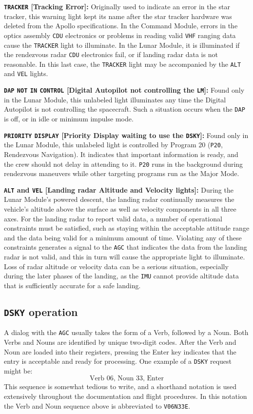 \documentclass[refcap, oxford]{ahsan}
\begin{document}
\textbf{\texttt{TRACKER} [Tracking Error]:} Originally used to indicate an error in the star tracker, this warning light kept its name after the star tracker hardware was deleted from the Apollo specifications. In the Command Module, errors in the optics assembly \texttt{CDU} electronics or problems in reading valid \texttt{VHF} ranging data cause the \texttt{TRACKER} light to illuminate. In the Lunar Module, it is illuminated if the rendezvous radar \texttt{CDU} electronics fail, or if landing radar data is not reasonable. In this last case, the \texttt{TRACKER} light may be accompanied by the \texttt{ALT} and \texttt{VEL} lights.

\textbf{\texttt{DAP} \texttt{NOT} \texttt{IN} \texttt{CONTROL} [Digital Autopilot not controlling the \texttt{LM}]:} Found only in the Lunar Module, this unlabeled light illuminates any time the Digital Autopilot is not controlling the spacecraft. Such a situation occurs when the \texttt{DAP} is off, or in idle or minimum impulse mode.

\textbf{\texttt{PRIORITY} \texttt{DISPLAY} [Priority Display waiting to use the \texttt{DSKY}]:} Found only in the Lunar Module, this unlabeled light is controlled by Program 20 (\texttt{P20}, Rendezvous Navigation). It indicates that important information is ready, and the crew should not delay in attending to it. \texttt{P20} runs in the background during rendezvous maneuvers while other targeting programs run as the Major Mode.

\textbf{\texttt{ALT} and \texttt{VEL} [Landing radar Altitude and Velocity lights]:} During the Lunar Module's powered descent, the landing radar continually measures the vehicle's altitude above the surface as well as velocity components in all three axes. For the landing radar to report valid data, a number of operational constraints must be satisfied, such as staying within the acceptable attitude range and the data being valid for a minimum amount of time. Violating any of these constraints generates a signal to the \texttt{AGC} that indicates the data from the landing radar is not valid, and this in turn will cause the appropriate light to illuminate. Loss of radar altitude or velocity data can be a serious situation, especially during the later phases of the landing, as the \texttt{IMU} cannot provide altitude data that is sufficiently accurate for a safe landing.


\subsection{\texttt{DSKY} operation}
A dialog with the \texttt{AGC} usually takes the form of a Verb, followed by a Noun. Both Verbs and Nouns are identified by unique two-digit codes. After the Verb and Noun are loaded into their registers, pressing the Enter key indicates that the entry is acceptable and ready for processing. One example of a \texttt{DSKY} request might be:
\[\text{Verb 06, Noun 33, Enter}\]
This sequence is somewhat tedious to write, and a shorthand notation is used extensively throughout the documentation and flight procedures. In this notation the Verb and Noun sequence above is abbreviated to \texttt{V06N33E}.
\end{document}
